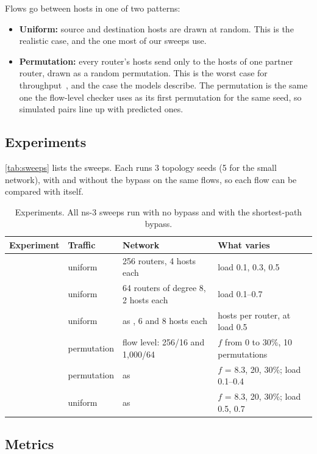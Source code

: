 Flows go between hosts in one of two patterns:
\begin{itemize}
  \item \textbf{Uniform:} source and destination hosts are drawn at random. This is the realistic case, and the one most of our sweeps use.
  \item \textbf{Permutation:} every router's hosts send only to the hosts of one partner router, drawn as a random permutation. This is the worst case for throughput~\cite{namyar}, and the case the models describe. The permutation is the same one the flow-level checker uses as its first permutation for the same seed, so simulated pairs line up with predicted ones.
\end{itemize}

\subsection{Experiments}

\autoref{tab:sweeps} lists the sweeps. Each runs 3 topology seeds (5 for the small network), with and without the bypass on the same flows, so each flow can be compared with itself.

\begin{table}[ht]
\centering
\small
\begin{tabularx}{\linewidth}{@{}l l l L@{}}
\toprule
Experiment & Traffic & Network & What varies \\
\midrule
{} & uniform & 256 routers, 4 hosts each & load 0.1, 0.3, 0.5 \\
 & uniform & 64 routers of degree 8, 2 hosts each & load 0.1--0.7 \\
 & uniform & as , 6 and 8 hosts each & hosts per router, at load 0.5 \\
 & permutation & flow level: 256/16 and 1{,}000/64 & $f$ from 0 to 30\%, 10 permutations \\
 & permutation & as  & $f$ = 8.3, 20, 30\%; load 0.1--0.4 \\
 & uniform & as  & $f$ = 8.3, 20, 30\%; load 0.5, 0.7 \\
\bottomrule
\end{tabularx}
\caption{Experiments. All ns-3 sweeps run with no bypass and with the shortest-path bypass.}
\label{tab:sweeps}
\end{table}

\subsection{Metrics}

